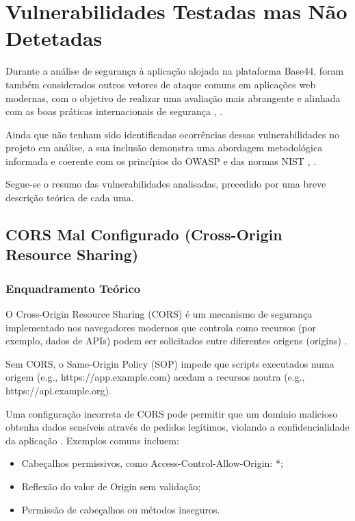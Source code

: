 \section{Vulnerabilidades Testadas mas Não Detetadas}

Durante a análise de segurança à aplicação alojada na plataforma Base44, foram também considerados outros vetores de ataque comuns em aplicações web modernas, com o objetivo de realizar uma avaliação mais abrangente e alinhada com as boas práticas internacionais de segurança \cite{ref1}, \cite{ref2}.

Ainda que não tenham sido identificadas ocorrências dessas vulnerabilidades no projeto em análise, a sua inclusão demonstra uma abordagem metodológica informada e coerente com os princípios do OWASP e das normas NIST \cite{ref3}, \cite{ref4}.

Segue-se o resumo das vulnerabilidades analisadas, precedido por uma breve descrição teórica de cada uma.

\subsection{CORS Mal Configurado (Cross-Origin Resource Sharing)}

\subsubsection{Enquadramento Teórico}

O Cross-Origin Resource Sharing (CORS) é um mecanismo de segurança implementado nos navegadores modernos que controla como recursos (por exemplo, dados de APIs) podem ser solicitados entre diferentes origens (origins) \cite{ref5}.

Sem CORS, o Same-Origin Policy (SOP) impede que scripts executados numa origem (e.g., https://app.example.com) acedam a recursos noutra (e.g., https://api.example.org).

Uma configuração incorreta de CORS pode permitir que um domínio malicioso obtenha dados sensíveis através de pedidos legítimos, violando a confidencialidade da aplicação \cite{ref6}. Exemplos comuns incluem:
\begin{itemize}

\item Cabeçalhos permissivos, como Access-Control-Allow-Origin: *;

\item Reflexão do valor de Origin sem validação;

\item Permissão de cabeçalhos ou métodos inseguros.

\end{itemize}

